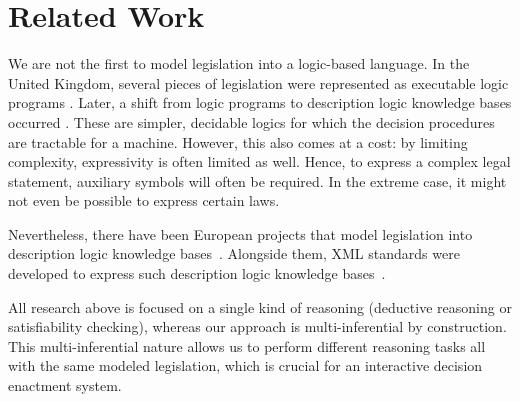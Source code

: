 \section{Related Work}
\label{related}
We are not the first to model legislation into a logic-based language.
In the United Kingdom, several pieces of legislation were represented as executable logic programs \cite{cacm/SergotSKKHC86, icail/Bench-CaponRRS87}.
Later, a shift from logic programs to description logic knowledge bases occurred \cite{valente1995legal, ijmms/KralingenVBH99}. %
These are simpler, decidable logics for which the decision procedures are tractable for a machine.
However, this also comes at a cost: by limiting complexity, expressivity is often limited as well. Hence, to express a complex legal statement, auxiliary symbols will often be required.
In the extreme case, it might not even be possible to express certain laws.

Nevertheless, there have been European projects that model legislation into description logic knowledge bases~\cite{HARNESS}.
Alongside them, XML standards were developed to express such description logic knowledge bases~\cite{lncs/BoerWV08, icail/PalmiraniCV09}.

All research above is focused on a single kind of reasoning (deductive reasoning or satisfiability checking), whereas our approach is multi-inferential by construction. This multi-inferential nature allows us to perform different reasoning tasks all with the same modeled legislation, which is crucial for an interactive decision enactment system.

